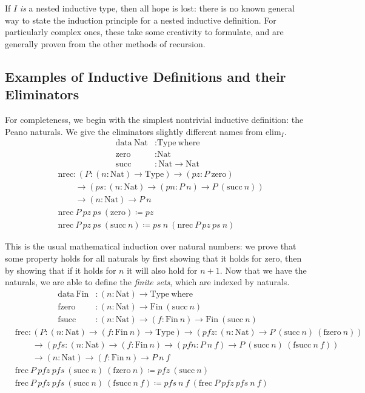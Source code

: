 \documentclass{report}
\newcommand{\Nat}{\const{Nat}}
\newcommand{\zero}{\const{zero}}
\renewcommand{\succ}{\const{succ}}
\newcommand{\Fin}{\const{Fin}}
\newcommand{\fzero}{\const{fzero}}
\newcommand{\fsucc}{\const{fsucc}}
\newcommand{\const}[1]{\text{#1}}
\newcommand{\data}{\const{data}}
\newcommand{\Type}{\const{Type}}
\newcommand{\where}{\const{where}}
\begin{document}
If $I$ \emph{is} a nested inductive type, then all hope is lost: there is no known general way to state the induction principle for a nested inductive definition. For particularly complex ones, these take some creativity to formulate, and are generally proven from the other methods of recursion.

\subsection{Examples of Inductive Definitions and their Eliminators}

For completeness, we begin with the simplest nontrivial inductive definition: the Peano naturals. We give the eliminators slightly different names from $\const{elim}_I$.
%
\begin{align*}
    \data ~ \Nat &: \Type ~ \where \\
    \zero &: \Nat \\
    \succ &: \Nat \to \Nat
\end{align*}
%
\begin{align*}
    &\const{nrec} : (P : (n: \Nat) \to \Type) \to (pz: P ~ \zero) \\
    &\qquad\to (ps: (n: \Nat) \to (pn: P ~ n) \to P ~ (\succ ~ n)) \\
    &\qquad\to (n: \Nat) \to P ~ n \\
    &\const{nrec} ~ P ~ pz ~ ps ~ (\zero) \coloneqq pz \\
    &\const{nrec} ~ P ~ pz ~ ps ~ (\succ ~ n) \coloneqq ps ~ n ~ (\const{nrec} ~ P ~ pz ~ ps ~ n)
\end{align*}

This is the usual mathematical induction over natural numbers: we prove that some property holds for all naturals by first showing that it holds for zero, then by showing that if it holds for $n$ it will also hold for $n+1$. Now that we have the naturals, we are able to define the \emph{finite sets}, which are indexed by naturals.
%
\begin{align*}
    \data ~ \Fin &: (n : \Nat) \to \Type ~ \where \\
    \fzero &: (n: \Nat) \to \Fin ~ (\succ ~ n) \\
    \fsucc &: (n: \Nat) \to (f: \Fin ~ n) \to \Fin ~ (\succ ~ n)
\end{align*}
%
\begin{align*}
    &\const{frec} : (P : (n: \Nat) \to (f: \Fin ~ n) \to \Type) \to (pfz: (n: \Nat) \to P ~ (\succ ~ n) ~ (\fzero ~ n)) \\
    &\qquad\to (pfs: (n: \Nat) \to (f: \Fin ~ n) \to (pfn: P ~ n ~ f) \to P ~ (\succ ~ n) ~ (\fsucc ~ n ~ f)) \\
    &\qquad\to (n: \Nat) \to (f: \Fin ~ n) \to P ~ n ~ f \\
    &\const{frec} ~ P ~ pfz ~ pfs ~ (\succ ~ n) ~ (\fzero ~ n) \coloneqq pfz ~ (\succ ~ n) \\
    &\const{frec} ~ P ~ pfz ~ pfs ~ (\succ ~ n) ~ (\fsucc ~ n ~ f) \coloneqq pfs ~ n ~ f ~ (\const{frec} ~ P ~ pfz ~ pfs ~ n ~ f)
\end{align*}
\end{document}
